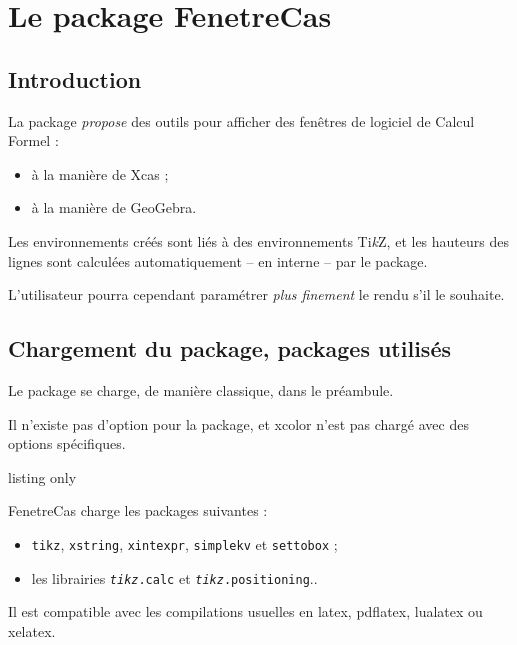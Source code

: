 \documentclass[french,a4paper,11pt]{article}
\providecommand\tikzlogo{Ti\textit{k}Z}
\let\TikZ\tikzlogo
\begin{document}
\section{Le package FenetreCas}

\subsection{Introduction}

\begin{noteblock}
La package \textit{propose} des outils pour afficher des fenêtres de logiciel de Calcul Formel :

\begin{itemize}
	\item à la manière de \textsf{Xcas} ;
	\item à la manière de \textsf{GeoGebra}.
\end{itemize}
\vspace*{-\baselineskip}\leavevmode
\end{noteblock}

\begin{importantblock}
Les environnements créés sont liés à des environnements \TikZ, et les hauteurs des lignes sont calculées automatiquement -- en interne -- par le package.

\smallskip

L'utilisateur pourra cependant paramétrer \textit{plus finement} le rendu s'il le souhaite.
\end{importantblock}

\subsection{Chargement du package, packages utilisés}

\begin{importantblock}
Le package se charge, de manière classique, dans le préambule.

Il n'existe pas d'option pour la package, et \textsf{xcolor} n'est pas chargé avec des options spécifiques.
\end{importantblock}

\begin{PresentationCode}{listing only}
\usepackage{FenetreCas}
\end{PresentationCode}

\begin{noteblock}
\textsf{FenetreCas} charge les packages suivantes :

\begin{itemize}
	\item \texttt{tikz}, \texttt{xstring}, \texttt{xintexpr}, \texttt{simplekv} et \texttt{settobox} ;
	\item les librairies \texttt{\textit{tikz}.calc} et \texttt{\textit{tikz}.positioning}..
\end{itemize}

Il est compatible avec les compilations usuelles en \textsf{latex}, \textsf{pdflatex}, \textsf{lualatex} ou \textsf{xelatex}.
\end{noteblock}
\end{document}
